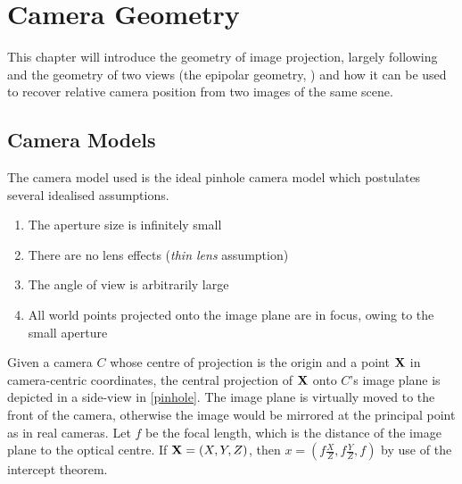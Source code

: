 \chapter{Camera Geometry}

This chapter will introduce the geometry of image projection, largely following
\citep[chapters 6,7]{h&z2004} and the geometry of two views (the epipolar
geometry, \citet[ch. 5.1]{ma2003}) and
how it can be used to recover relative camera position from two images of the
same scene. 

\section{Camera Models}

The camera model used is the ideal pinhole camera model which postulates several
idealised assumptions.
\begin{enumerate}
   \item The aperture size is infinitely small
   \item There are no lens effects (\emph{thin lens} assumption)
   \item The angle of view is arbitrarily large
   \item All world points projected onto the image plane are in focus, owing to
      the small aperture
\end{enumerate}


Given a camera $C$ whose centre of projection is the origin and a point
$\mathbf{X}$ in camera-centric coordinates, the central projection of
$\mathbf{X}$ onto $C$'s image plane is depicted in a side-view in
\autoref{pinhole}.  The image plane is virtually moved to the front of the
camera, otherwise the image would be mirrored at the principal point as in real
cameras.  Let $f$ be the focal length, which is the distance of the image plane
to the optical centre.  If $\mathbf{X} = (X,Y,Z)$, then $x=\left(f \frac{X}{Z},
f \frac{Y}{Z}, f\right)$ by use of the intercept theorem.%



